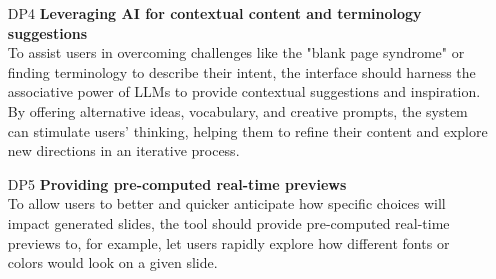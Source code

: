 \begin{itemize}[font=\bfseries,
  align=left]
    \item[DP4] \textbf{Leveraging AI for contextual content and terminology suggestions  } \\
    To assist users in overcoming challenges like the "blank page syndrome" or finding terminology to describe their intent, the interface should harness the associative power of LLMs to provide contextual suggestions and inspiration. By offering alternative ideas, vocabulary, and creative prompts, the system can stimulate users' thinking, helping them to refine their content and explore new directions in an iterative process.

    \item[DP5] \textbf{Providing pre-computed real-time previews} \\
    To allow users to better and quicker anticipate how specific choices will impact generated slides, the tool should provide pre-computed real-time previews to, for example, let users rapidly explore how different fonts or colors would look on a given slide.    



    
\end{itemize}
